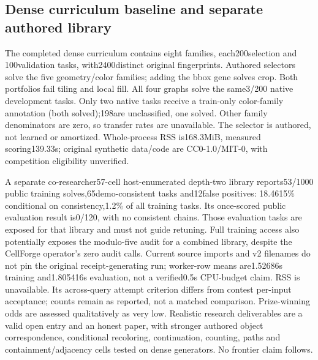 \documentclass[11pt]{article}
\begin{document}
\subsection{Dense curriculum baseline and separate authored library}
The completed dense curriculum contains eight families, each200selection and
100validation tasks, with2400distinct original fingerprints. Authored selectors
solve the five geometry/color families; adding the bbox gene solves crop.
Both portfolios fail tiling and local fill. All four graphs solve the same3/200
native development tasks. Only two native tasks receive a train-only color-family
annotation (both solved);198are unclassified, one solved. Other family denominators
are zero, so transfer rates are unavailable. The selector is authored, not learned
or amortized. Whole-process RSS is168.3MiB, measured scoring139.33s; original
synthetic data/code are CC0-1.0/MIT-0, with competition eligibility unverified.

A separate co-researcher57-cell host-enumerated depth-two library reports53/1000
public training solves,65demo-consistent tasks and12false positives:
18.4615\% conditional on consistency,1.2\% of all training tasks. Its once-scored
public evaluation result is0/120, with no consistent chains. Those evaluation
tasks are exposed for that library and must not guide retuning. Full training
access also potentially exposes the modulo-five audit for a combined library,
despite the CellForge operator's zero audit calls. Current source imports and
v2 filenames do not pin the original receipt-generating run; worker-row means
are1.52686s training and1.805416s evaluation, not a verified0.5s CPU-budget claim.
RSS is unavailable. Its across-query attempt criterion differs from contest
per-input acceptance; counts remain as reported, not a matched comparison.
Prize-winning odds are assessed qualitatively as very low. Realistic research
deliverables are a valid open entry and an honest paper, with stronger authored
object correspondence, conditional recoloring, continuation, counting, paths and
containment/adjacency cells tested on dense generators. No frontier claim follows.
\end{document}
